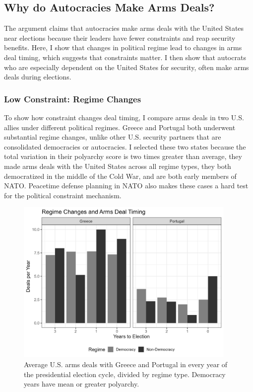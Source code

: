 \documentclass[12pt]{article}
\begin{document}
\subsection{Why do Autocracies Make Arms Deals?}


The argument claims that autocracies make arms deals with the United States near elections because their leaders have fewer constraints and reap security benefits. 
Here, I show that changes in political regime lead to changes in arms deal timing, which suggests that constraints matter. 
I then show that autocrats who are especially dependent on the United States for security, often make arms deals during elections.


\subsubsection{Low Constraint: Regime Changes}


To show how constraint changes deal timing, I compare arms deals in two U.S. allies under different political regimes. 
Greece and Portugal both underwent substantial regime changes, unlike other U.S. security partners that are consolidated democracies or autocracies. 
I selected these two states because the total variation in their polyarchy score is two times greater than average, they made arms deals with the United States across all regime types, they both democratized in the middle of the Cold War, and are both early members of NATO. 
Peacetime defense planning in NATO also makes these cases a hard test for the political constraint mechanism.


\begin{figure}[htpb]
	\centering
		\includegraphics[width=0.95\textwidth]{../figures/deals-regime-change.png}
	\caption{Average U.S. arms deals with Greece and Portugal in every year of the presidential election cycle, divided by regime type. Democracy years have mean or greater polyarchy.}
	\label{fig:deals-regime-change}
\end{figure}
\end{document}
